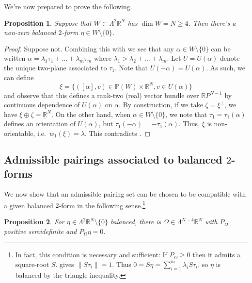 \documentclass[11pt]{amsart}
\numberwithin{equation}{section}
\theoremstyle{plain}
\newtheorem{proposition}[proposition]{Proposition}
\theoremstyle{definition}
\theoremstyle{remark}
\newcommand{\R}{\mathbb{R}}
\begin{document}
We're now prepared to prove the following.
\begin{proposition}\label{prop:finding-balanced-form}
Suppose that $W\subset \Lambda^2\R^N$ has $\dim W  = N\geq 4$. Then there's  a non-zero balanced $2$-form $\eta \in W\setminus\{0\}$.
\end{proposition}
\begin{proof}
Suppose not. Combining this with  we see that any $\alpha \in W \setminus \{0\}$ can be written $\alpha = \lambda_1 \tau_1 + \dots + \lambda_m \tau_m$  where $\lambda_1 > \lambda_2 + \dots + \lambda_m$. Let $U=U(\alpha)$ denote the unique two-plane associated to $\tau_1$. Note that $U(-\alpha) = U(\alpha)$. As such, we can define
\[
\xi = \{ ([\alpha] , v)  \in  \mathbb{P}(W) \times \R^N ,   v \in U(\alpha)  \} 
\]
and observe that this defines a rank-two (real) vector bundle over $\R P^{N-1}$ by continuous dependence of $U(\alpha)$ on $\alpha$. By construction, if we take  $\zeta = \xi^\perp$, we have $\xi \oplus \zeta = \underline{\R}^{N}$. On the other hand, when $\alpha \in W\setminus\{0\}$, we note that $\tau_1=\tau_1(\alpha)$ defines an orientation of $U(\alpha)$, but $\tau_1(-\alpha) = -\tau_1(\alpha)$. Thus, $\xi$ is non-orientable, i.e.\ $w_1(\xi) = \lambda$. This contradicts .  
\end{proof}
\subsection{Admissible pairings associated to balanced $2$-forms}
We now show that an admissible pairing set can be chosen to be compatible with a given balanced $2$-form in the following sense.\footnote{In fact, this condition is necessary and sufficient: If $P_\Omega\geq 0$ then it admits a square-root $S$.  gives $\|S \tau_i\| = 1$. Thus $0 = S \eta = \sum_{i=1}^m \lambda_i S\tau_i$, so $\eta$ is balanced by the triangle inequality.  }  

\begin{proposition}\label{prop:pairing-from-balanced}
For $\eta\in \Lambda^2\R^N\setminus\{0\}$ balanced, there is $\Omega \in \Lambda^{N-4}\R^N$ with $P_\Omega$ positive semidefinite and $P_\Omega \eta = 0$. 
\end{proposition}
\end{document}
